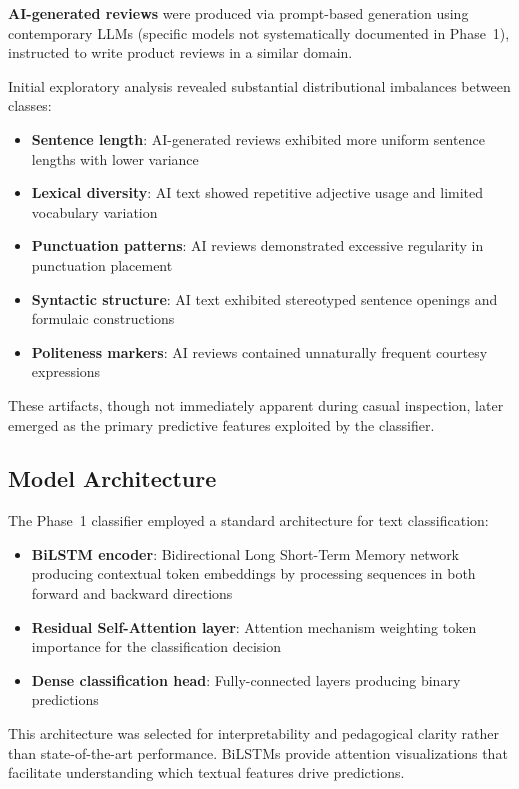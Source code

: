 \documentclass[conference]{IEEEtran}
\begin{document}
\textbf{AI-generated reviews} were produced via prompt-based generation using contemporary LLMs (specific models not systematically documented in Phase~1), instructed to write product reviews in a similar domain.

Initial exploratory analysis revealed substantial distributional imbalances between classes:

\begin{itemize}
    \item \textbf{Sentence length}: AI-generated reviews exhibited more uniform sentence lengths with lower variance
    \item \textbf{Lexical diversity}: AI text showed repetitive adjective usage and limited vocabulary variation
    \item \textbf{Punctuation patterns}: AI reviews demonstrated excessive regularity in punctuation placement
    \item \textbf{Syntactic structure}: AI text exhibited stereotyped sentence openings and formulaic constructions
    \item \textbf{Politeness markers}: AI reviews contained unnaturally frequent courtesy expressions
\end{itemize}

These artifacts, though not immediately apparent during casual inspection, later emerged as the primary predictive features exploited by the classifier.

\subsection{Model Architecture}

The Phase~1 classifier employed a standard architecture for text classification:

\begin{itemize}
    \item \textbf{BiLSTM encoder}: Bidirectional Long Short-Term Memory network producing contextual token embeddings by processing sequences in both forward and backward directions
    \item \textbf{Residual Self-Attention layer}: Attention mechanism weighting token importance for the classification decision
    \item \textbf{Dense classification head}: Fully-connected layers producing binary predictions
\end{itemize}

This architecture was selected for interpretability and pedagogical clarity rather than state-of-the-art performance. BiLSTMs provide attention visualizations that facilitate understanding which textual features drive predictions.
\end{document}

